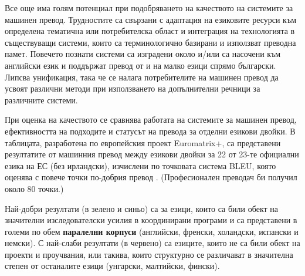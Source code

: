 \documentclass[]{../../metanetpaper}
\begin{document}
\begin{multicols}{2}
Все  още има голям потенциал при подобряването на качеството на системите за машинен превод. Трудностите са свързани с адаптация на езиковите ресурси към определена тематична или потребителска област и интеграция на технологията в
 съществуващи системи, които са терминологично базирани и използват преводна памет. 
%
Повечето познати системи са изградени около и/или са насочени към английски език и поддържат превод от и на малко езици спрямо български. Липсва унификация, така че се налага потребителите на машинен превод да усвоят
 различни методи при използването на допълнителни речници за различните системи.

При оценка на качеството се сравнява работата на системите за
 машинен превод, ефективността на подходите и статусът на превода за отделни
 езикови двойки. В таблицата, разработена по европейския проект
 Euromatrix+, са представени резултатите от машинния
 превод между езикови двойки за 22 от 23-те официални езика на ЕС
 (без ирландски), изчислени по точковата система BLEU, която оценява с повече точки по-добрия превод \cite{bleu1}. (Професионален преводач би получил около 80 точки.)

Най-добри резултати (в зелено и синьо) са за езици, които са били обект на значителни изследователски усилия в координирани програми и са представени в големи по обем \textbf{паралелни корпуси} (английски, френски, холандски, испански и немски). С най-слаби резултати (в червено) са езиците, които не са били обект на проекти и проучвания, или такива, които структурно се различават в значителна степен от останалите езици (унгарски, малтийски, фински).



\end{multicols}
\end{document}
